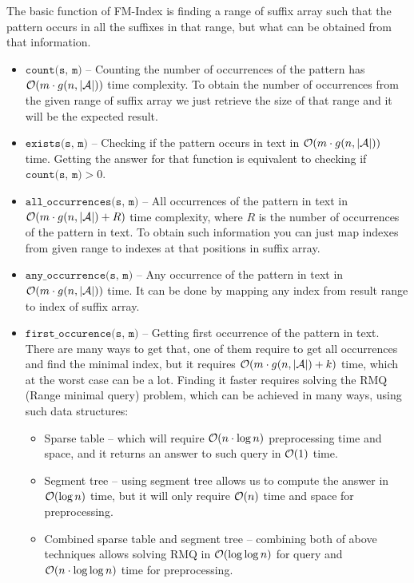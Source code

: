 The basic function of FM-Index is finding a range of suffix array such that the pattern occurs in all the suffixes in that range, but what can be obtained from that information.
\begin{itemize}
    \item $\texttt{count(s, m)}$ -- Counting the number of occurrences of the pattern has $\mathcal{O}(m\cdot g(n, |\mathcal{A}|))$ time complexity. To obtain the number of occurrences from the given range of suffix array we just retrieve the size of that range and it will be the expected result.
    \item $\texttt{exists(s, m)}$ -- Checking if the pattern occurs in text in $\mathcal{O}(m\cdot g(n, |\mathcal{A}|))$ time. Getting the answer for that function is equivalent to checking if $\texttt{count(s, m)} > 0$. 
    \item $\texttt{all\_occurrences(s, m)}$ -- All occurrences of the pattern in text in $\mathcal{O}(m\cdot g(n, |\mathcal{A}|) + R)$ time complexity, where $R$ is the number of occurrences of the pattern in text.  To obtain such information you can just map indexes from given range to indexes at that positions in suffix array.
    \item $\texttt{any\_occurrence(s, m)}$ -- Any occurrence of the pattern in text in $\mathcal{O}(m\cdot g(n, |\mathcal{A}|))$ time. It can be done by mapping any index from result range to index of suffix array.
    \item $\texttt{first\_occurence(s, m)}$ -- Getting first occurrence of the pattern in text. There are many ways to get that, one of them require to get all occurrences and find the minimal index, but it requires $\mathcal{O}(m\cdot g(n, |\mathcal{A}|) + k)$ time, which at the worst case can be a lot. Finding it faster requires solving the RMQ (Range minimal query) problem, which can be achieved in many ways, using such data structures:
    \begin{itemize}
        \item Sparse table \cite{RMQ1} -- which will require $\mathcal{O}(n \cdot \log n)$ preprocessing time and space, and it returns an answer to such query in $\mathcal{O}(1)$ time.
        \item Segment tree \cite{SegmentTreeRMQ} -- using segment tree allows us to compute the answer in $\mathcal{O}(\log n)$ time, but it will only require $\mathcal{O}(n)$ time and space for preprocessing.
        \item Combined sparse table and segment tree -- combining both of above techniques allows solving RMQ in $\mathcal{O}(\log \log n)$ for query and $\mathcal{O}(n \cdot \log \log n)$ time for preprocessing.

\end{itemize}
\end{itemize}
